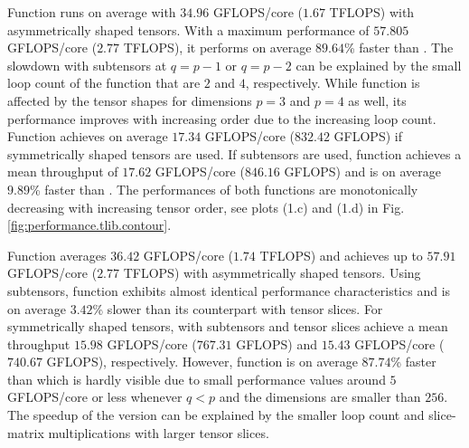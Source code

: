 Function  runs on average with $34.96$ GFLOPS/core ($1.67$ TFLOPS) with asymmetrically shaped tensors.
With a maximum performance of $57.805$ GFLOPS/core ($2.77$ TFLOPS), it performs on average $89.64$\% faster than .
The slowdown with subtensors at $q=p-1$ or $q=p-2$ can be explained by the small loop count of the function that are $2$ and $4$, respectively.
While function  is affected by the tensor shapes for dimensions $p=3$ and $p=4$ as well, its performance improves with increasing order due to the increasing loop count.
Function  achieves on average $17.34$ GFLOPS/core ($832.42$ GFLOPS) if symmetrically shaped tensors are used.
If subtensors are used, function  achieves a mean throughput of $17.62$ GFLOPS/core ($846.16$ GFLOPS) and is on average $9.89$\% faster than .
The performances of both functions are monotonically decreasing with increasing tensor order, see plots (1.c) and (1.d) in Fig. \ref{fig:performance.tlib.contour}.


Function  averages $36.42$ GFLOPS/core ($1.74$ TFLOPS) and achieves up to $57.91$ GFLOPS/core ($2.77$ TFLOPS) with asymmetrically shaped tensors.
Using subtensors, function  exhibits almost identical performance characteristics and is on average $3.42$\% slower than its counterpart with tensor slices.
For symmetrically shaped tensors,  with subtensors and tensor slices achieve a mean throughput $15.98$ GFLOPS/core ($767.31$ GFLOPS) and $15.43$ GFLOPS/core ($740.67$ GFLOPS), respectively.
However, function  is on average $87.74$\% faster than  which is hardly visible due to small performance values around $5$ GFLOPS/core or less whenever $q<p$ and the dimensions are smaller than $256$.
The speedup of the  version can be explained by the smaller loop count and slice-matrix multiplications with larger tensor slices.

